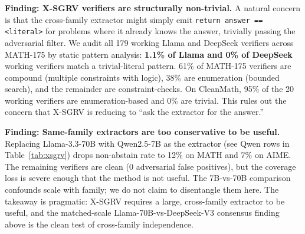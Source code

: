 \documentclass{article}
\begin{document}
\textbf{Finding: X-SGRV verifiers are structurally non-trivial.} A natural concern is that the cross-family extractor might simply emit \texttt{return answer == <literal>} for problems where it already knows the answer, trivially passing the adversarial filter. We audit all 179 working Llama and DeepSeek verifiers across MATH-175 by static pattern analysis: \textbf{1.1\% of Llama and 0\% of DeepSeek} working verifiers match a trivial-literal pattern. 61\% of MATH-175 verifiers are compound (multiple constraints with logic), 38\% are enumeration (bounded search), and the remainder are constraint-checks. On CleanMath, 95\% of the 20 working verifiers are enumeration-based and 0\% are trivial. This rules out the concern that X-SGRV is reducing to ``ask the extractor for the answer.''

\textbf{Finding: Same-family extractors are too conservative to be useful.} Replacing Llama-3.3-70B with Qwen2.5-7B as the extractor (see Qwen rows in Table~\ref{tab:xsgrv}) drops non-abstain rate to 12\% on MATH and 7\% on AIME. The remaining verifiers are clean (0 adversarial false positives), but the coverage loss is severe enough that the method is not useful. The 7B-vs-70B comparison confounds scale with family; we do not claim to disentangle them here. The takeaway is pragmatic: X-SGRV requires a large, cross-family extractor to be useful, and the matched-scale Llama-70B-vs-DeepSeek-V3 consensus finding above is the clean test of cross-family independence.
\end{document}
